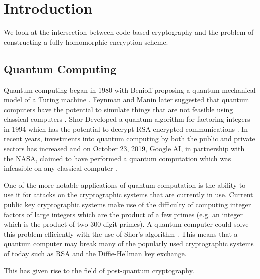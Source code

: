 \chapter{Introduction}

We look at the intersection between code-based cryptography and the problem of constructing a fully homomorphic encryption scheme.


\section{Quantum Computing}

Quantum computing began in 1980 with Benioff proposing a quantum mechanical model of a Turing machine \cite{benioff}. Feynman and Manin later suggested that quantum computers have the potential to simulate things that are not feasible using classical computers \cite{feynman} \cite{manin}. Shor Developed a quantum algorithm for factoring integers in 1994 which has the potential to decrypt RSA-encrypted communications \cite{mermin}. In recent years, investments into quantum computing by both the public and private sectors has increased and on October 23, 2019, Google AI, in partnership with the NASA, claimed to have performed a quantum computation which was infeasible on any classical computer \cite{gibney}.

One of the more notable applications of quantum computation is the ability to use it for attacks on the cryptographic systems that are currently in use. Current public key cryptographic systems make use of the difficulty of computing integer factors of large integers which are the product of a few primes (e.g. an integer which is the product of two 300-digit primes)\cite{lenstra}. A quantum computer could solve this problem efficiently with the use of Shor's algorithm \cite{shor}\cite{beckman}. This means that a quantum computer may break many of the popularly used cryptographic systems of today such as RSA and the Diffie-Hellman key exchange.

This has given rise to the field of post-quantum cryptography.

